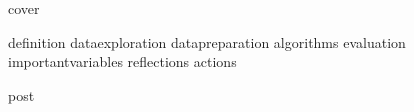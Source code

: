 \documentclass{article}
\begin{document}
{cover}

{definition}
{dataexploration}
{datapreparation}
{algorithms}
{evaluation}
{importantvariables}
{reflections}
{actions}

{post}
\end{document}
